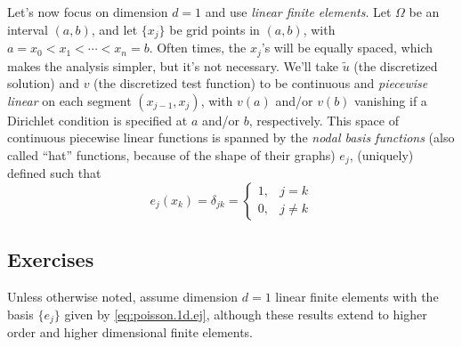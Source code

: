 Let's now focus on dimension $d = 1$ and use \emph{linear finite elements}. Let $\Omega$ be an interval $(a,b)$, and let $\{x_j\}$ be grid points in $(a,b)$, with $a = x_0 < x_1 < \dotsm < x_n = b$. Often times, the $x_j$'s will be equally spaced, which makes the analysis simpler, but it's not necessary. We'll take $\tilde{u}$ (the discretized solution) and $v$ (the discretized test function) to be continuous and \emph{piecewise linear} on each segment $\left( x_{j-1}, x_j \right)$, with $v(a)$ and/or $v(b)$ vanishing if a Dirichlet condition is specified at $a$ and/or $b$, respectively. This space of continuous piecewise linear functions is spanned by the \emph{nodal basis functions} (also called ``hat'' functions, because of the shape of their graphs) $e_j$, (uniquely) defined such that
\begin{equation}\label{eq:poisson.1d.ej}
e_j(x_k) = \delta_{jk} = \begin{cases} 1, & j = k \\ 0, & j \neq k \end{cases}
\end{equation}

\subsection{Exercises}

Unless otherwise noted, assume dimension $d = 1$ linear finite elements with the basis $\{e_j\}$ given by \eqref{eq:poisson.1d.ej}, although these results extend to higher order and higher dimensional finite elements.

